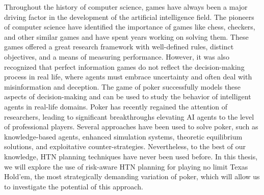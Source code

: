 Throughout the history of computer science, games have always been a major driving factor in the development of the artificial intelligence field. The pioneers of computer science have identified the importance of games like chess, checkers, and other similar games and have spent years working on solving them. These games offered a great research framework with well-defined rules, distinct objectives, and a means of measuring performance. However, it was also recognized that perfect information games do not reflect the decision-making process in real life, where agents must embrace uncertainty and often deal with misinformation and deception. The game of poker successfully models these aspects of decision-making and can be used to study the behavior of intelligent agents in real-life domains. Poker has recently regained the attention of researchers, leading to significant breakthroughs elevating AI agents to the level of professional players. Several approaches have been used to solve poker, such as knowledge-based agents, enhanced simulation systems, theoretic equilibrium solutions, and exploitative counter-strategies. Nevertheless, to the best of our knowledge, HTN planning techniques have never been used before. In this thesis, we will explore the use of risk-aware HTN planning for playing no limit Texas Hold'em, the most strategically demanding variation of poker, which will allow us to investigate the potential of this approach.
